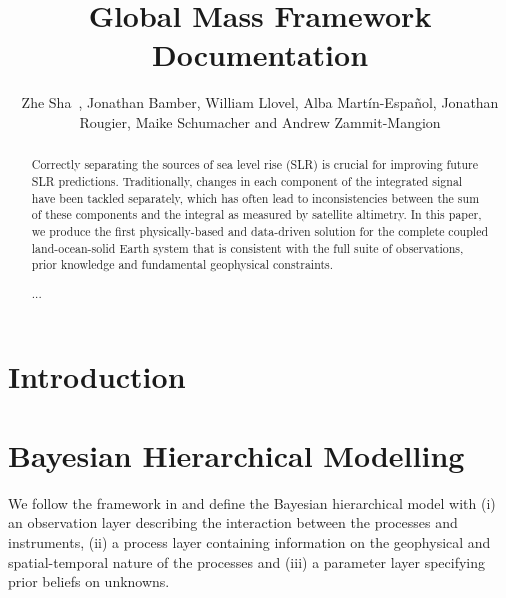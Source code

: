 \documentclass[cmbright,fleqn,referee]{envauth}
\begin{document}
\title{Global Mass Framework Documentation}

\author{Zhe Sha\corrauth\ , Jonathan Bamber, William Llovel, Alba Martín-Español, Jonathan Rougier, Maike Schumacher and Andrew Zammit-Mangion}


\address{Bristol Glaciology Centre, School of Geography, University of Bristol, Bristol, BS8 1SS, UK\\
Building, Institute, Street Address, City, Code, Country\\
Building, Institute, Street Address, City, Code, Country
}

\begin{abstract}
Correctly separating the sources of sea level rise (SLR) is crucial for improving future SLR predictions. Traditionally, changes in each component of the integrated signal have been tackled separately, which has often lead to inconsistencies between the sum of these components and the integral as measured by satellite altimetry. In this paper, we produce the first physically-based and data-driven solution for the complete coupled land-ocean-solid Earth system that is consistent with the full suite of observations, prior knowledge and fundamental geophysical constraints. 

...

\end{abstract}

\maketitle


\section{Introduction}
\label{s:intro}


\section{Bayesian Hierarchical Modelling}
\label{s:model}
We follow the framework in \citet{b1} and define the Bayesian hierarchical model with (i) an observation layer describing the interaction between the processes and instruments, (ii) a process layer containing information on the geophysical and spatial-temporal nature of the processes and (iii) a parameter layer specifying prior beliefs on unknowns. 
\end{document}
